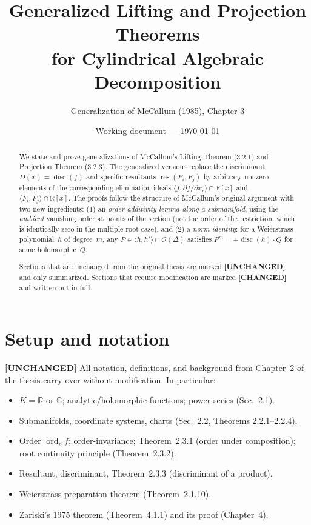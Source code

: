 \documentclass[11pt]{article}
\title{Generalized Lifting and Projection Theorems\\for Cylindrical Algebraic Decomposition}
\author{Generalization of McCallum (1985), Chapter 3}
\date{Working document --- \today}
\theoremstyle{plain}
\theoremstyle{definition}
\newcommand{\R}{\mathbb{R}}
\newcommand{\C}{\mathbb{C}}
\DeclareMathOperator{\ord}{ord}
\DeclareMathOperator{\res}{res}
\DeclareMathOperator{\disc}{disc}
\begin{document}
\maketitle

\begin{abstract}
We state and prove generalizations of McCallum's Lifting Theorem (3.2.1)
and Projection Theorem (3.2.3).  The generalized versions replace the
discriminant $D(x) = \disc(f)$ and specific resultants $\res(F_i, F_j)$
by arbitrary nonzero elements of the corresponding elimination ideals
$\langle f, \partial f / \partial x_r \rangle \cap \R[x]$ and
$\langle F_i, F_j \rangle \cap \R[x]$.  The proofs follow the structure of
McCallum's original argument with two new ingredients: (1) an
\emph{order additivity lemma along a submanifold}, using the \emph{ambient}
vanishing order at points of the section (not the order of the restriction,
which is identically zero in the multiple-root case), and
(2) a \emph{norm identity}: for a Weierstrass polynomial~$h$ of degree~$m$,
any $P \in \langle h, h' \rangle \cap \mathcal{O}(\Delta)$ satisfies
$P^m = \pm\disc(h) \cdot Q$ for some holomorphic~$Q$.

Sections that are unchanged from the original thesis are marked
\textbf{[UNCHANGED]} and only summarized.
Sections that require modification are marked \textbf{[CHANGED]} and
written out in full.
\end{abstract}

\tableofcontents

\section{Setup and notation}
\label{sec:setup}

\textbf{[UNCHANGED]}
All notation, definitions, and background from Chapter~2 of the thesis
carry over without modification.  In particular:
\begin{itemize}
\item $K = \R$ or $\C$; analytic/holomorphic functions; power series
  (Sec.~2.1).
\item Submanifolds, coordinate systems, charts (Sec.~2.2, Theorems 2.2.1--2.2.4).
\item Order $\ord_p f$; order-invariance; Theorem~2.3.1 (order under
  composition); root continuity principle (Theorem~2.3.2).
\item Resultant, discriminant, Theorem~2.3.3 (discriminant of a product).
\item Weierstrass preparation theorem (Theorem~2.1.10).
\item Zariski's 1975 theorem (Theorem~4.1.1) and its proof (Chapter~4).
\end{itemize}
\end{document}
